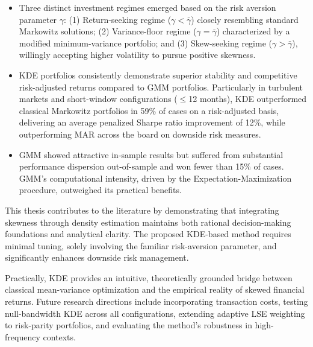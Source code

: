 \begin{itemize}
    \item Three distinct investment regimes emerged based on the risk aversion parameter $\gamma$: (1) Return-seeking regime ($\gamma<\bar{\gamma}$) closely resembling standard Markowitz solutions; (2) Variance-floor regime ($\gamma=\bar{\gamma}$) characterized by a modified minimum-variance portfolio; and (3) Skew-seeking regime ($\gamma>\bar{\gamma}$), willingly accepting higher volatility to pursue positive skewness.
    \newpage
    \item KDE portfolios consistently demonstrate superior stability and competitive risk-adjusted returns compared to GMM portfolios. Particularly in turbulent markets and short-window configurations ($\leq$12 months), KDE outperformed classical Markowitz portfolios in 59\% of cases on a risk-adjusted basis, delivering an average penalized Sharpe ratio improvement of 12\%, while outperforming MAR across the board on downside risk measures.
    \item GMM showed attractive in-sample results but suffered from substantial performance dispersion out-of-sample and won fewer than 15\% of cases. GMM's computational intensity, driven by the Expectation-Maximization procedure, outweighed its practical benefits.
\end{itemize}

This thesis contributes to the literature by demonstrating that integrating skewness through density estimation maintains both rational decision-making foundations and analytical clarity. The proposed KDE-based method requires minimal tuning, solely involving the familiar risk-aversion parameter, and significantly enhances downside risk management.

Practically, KDE provides an intuitive, theoretically grounded bridge between classical mean-variance optimization and the empirical reality of skewed financial returns. Future research directions include incorporating transaction costs, testing null-bandwidth KDE across all configurations, extending adaptive LSE weighting to risk-parity portfolios, and evaluating the method's robustness in high-frequency contexts.
